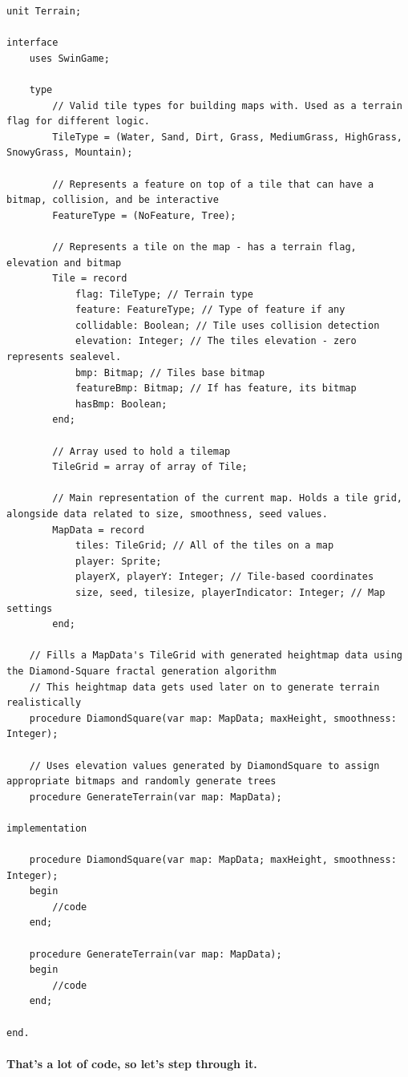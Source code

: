 \documentclass{article}
\begin{document}
\begin{verbatim}
unit Terrain;

interface
	uses SwinGame;

	type
		// Valid tile types for building maps with. Used as a terrain flag for different logic.
		TileType = (Water, Sand, Dirt, Grass, MediumGrass, HighGrass, SnowyGrass, Mountain);

		// Represents a feature on top of a tile that can have a bitmap, collision, and be interactive
		FeatureType = (NoFeature, Tree);

		// Represents a tile on the map - has a terrain flag, elevation and bitmap
		Tile = record
			flag: TileType; // Terrain type
			feature: FeatureType; // Type of feature if any
			collidable: Boolean; // Tile uses collision detection
			elevation: Integer; // The tiles elevation - zero represents sealevel.
			bmp: Bitmap; // Tiles base bitmap
			featureBmp: Bitmap; // If has feature, its bitmap
			hasBmp: Boolean;
		end;

		// Array used to hold a tilemap
		TileGrid = array of array of Tile;

		// Main representation of the current map. Holds a tile grid, alongside data related to size, smoothness, seed values.
		MapData = record
			tiles: TileGrid; // All of the tiles on a map
			player: Sprite;
			playerX, playerY: Integer; // Tile-based coordinates
			size, seed, tilesize, playerIndicator: Integer; // Map settings
		end;

	// Fills a MapData's TileGrid with generated heightmap data using the Diamond-Square fractal generation algorithm
	// This heightmap data gets used later on to generate terrain realistically
	procedure DiamondSquare(var map: MapData; maxHeight, smoothness: Integer);

	// Uses elevation values generated by DiamondSquare to assign appropriate bitmaps and randomly generate trees
	procedure GenerateTerrain(var map: MapData);

implementation

	procedure DiamondSquare(var map: MapData; maxHeight, smoothness: Integer);
	begin
		//code
	end;

	procedure GenerateTerrain(var map: MapData);
	begin
		//code
	end;

end.
\end{verbatim}

\paragraph{That's a lot of code, so let's step through it.}\mbox{}
\end{document}
